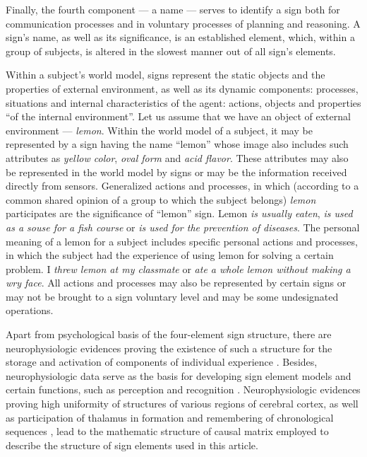 \documentclass[review]{elsarticle}
\begin{document}
Finally, the fourth component --- a name --- serves to identify a sign both for communication processes and in voluntary processes of planning and reasoning. A sign's name, as well as its significance, is an established element, which, within a group of subjects, is altered in the slowest manner out of all sign's elements.

Within a subject's world model, signs represent the static objects and the properties of external environment, as well as its dynamic components: processes, situations and internal characteristics of the agent: actions, objects and properties ``of the internal environment''. Let us assume that we have an object of external environment --- \textit{lemon}. Within the world model of a subject, it may be represented by a sign having the name ``lemon'' whose image also includes such attributes as \textit{yellow color}, \textit{oval form} and \textit{acid flavor}. These attributes may also be represented in the world model by signs or may be the information received directly from sensors. Generalized actions and processes, in which (according to a common shared opinion of a group to which the subject belongs) \textit{lemon} participates are the significance of ``lemon'' sign. Lemon \textit{is usually eaten}, \textit{is used as a souse for a fish course} or \textit{is used for the prevention of diseases}. The personal meaning of a lemon for a subject includes specific personal actions and processes, in which the subject had the experience of using lemon for solving a certain problem. I \textit{threw lemon at my classmate} or \textit{ate a whole lemon without making a wry face}. All actions and processes may also be represented by certain signs or may not be brought to a sign voluntary level and may be some undesignated operations.

Apart from psychological basis of the four-element sign structure, there are neurophysiologic evidences proving the existence of such a structure for the storage and activation of components of individual experience \cite{Edelman1987,Ivanitsky1997}. Besides, neurophysiologic data serve as the basis for developing sign element models and certain functions, such as perception and recognition \cite{George2009,Osipov2015d}. Neurophysiologic evidences proving high uniformity of structures of various regions of cerebral cortex, as well as participation of thalamus in formation and remembering of chronological sequences \cite{Buxhoeveden2002,Constantinople2013}, lead to the mathematic structure of causal matrix \cite{Osipov2015d} employed to describe the structure of sign elements used in this article.
\end{document}
